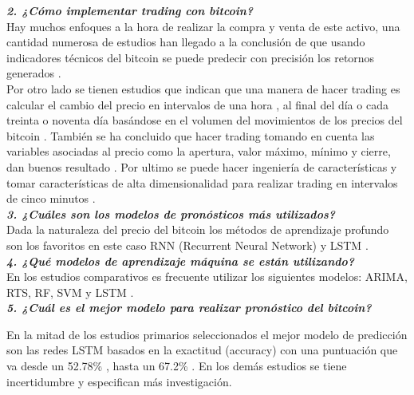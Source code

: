 \textbf{\textit{2. ¿Cómo implementar trading con bitcoin?}}\\
Hay muchos enfoques a la hora de realizar la compra y venta de este activo, una cantidad numerosa de estudios han llegado a la conclusión de que usando indicadores técnicos del bitcoin se puede predecir con precisión los retornos generados \parencite{mudassirTimeseriesForecastingBitcoin2020}.\\
Por otro lado se tienen estudios que indican que una manera de hacer trading es calcular el cambio del precio en intervalos de una hora \parencite{phaladisailoedMachineLearningModels2018}, al final del día o cada treinta o noventa día basándose en el volumen del movimientos de los precios del bitcoin \parencite{mudassirTimeseriesForecastingBitcoin2020}. También se ha concluido que hacer trading tomando en cuenta las variables asociadas al precio como la apertura, valor máximo, mínimo y cierre, dan buenos resultado \parencite{felizardoComparativeStudyBitcoin2019,phaladisailoedMachineLearningModels2018}. Por ultimo se puede hacer ingeniería de características y tomar características de alta dimensionalidad para realizar trading en intervalos de cinco minutos \parencite{chenBitcoinPricePrediction2020} .\\

\textbf{\textit{3. ¿Cuáles son los modelos de pronósticos más utilizados?}}\\
Dada la naturaleza del precio del bitcoin los métodos de aprendizaje profundo son los favoritos en este caso RNN (Recurrent Neural Network) y LSTM \parencite{mcnallyPredictingPriceBitcoin2018}.\\

\textbf{\textit{4. ¿Qué modelos de aprendizaje máquina se están utilizando?}}\\
En los estudios comparativos es frecuente utilizar los siguientes modelos: ARIMA, RTS, RF, SVM y LSTM \parencite{felizardoComparativeStudyBitcoin2019,phaladisailoedMachineLearningModels2018}.\\

\textbf{\textit{5. ¿Cuál es el mejor modelo para realizar pronóstico del bitcoin?}}

En la mitad de los estudios primarios seleccionados \parencite{mudassirTimeseriesForecastingBitcoin2020,chenBitcoinPricePrediction2020,mcnallyPredictingPriceBitcoin2018} el mejor modelo de predicción son las redes LSTM basados en la exactitud (accuracy) con una puntuación que va desde un 52.78\% \parencite{mcnallyPredictingPriceBitcoin2018}, hasta un 67.2\% \parencite{chenBitcoinPricePrediction2020}. En los demás estudios se tiene incertidumbre y especifican más investigación.

